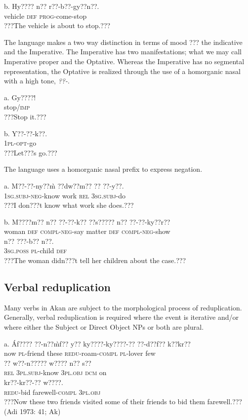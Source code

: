 \documentclass[output=paper]{langsci/langscibook}
\begin{document}
\ea
\gll  b.  Hy????    n??  r??-b??-gy??n??.\\
       vehicle    \textsc{def}  \textsc{prog}{}-come-stop\\
\glt   ???The vehicle is about to stop.???
\z

The language makes a two way distinction in terms of mood ??? the indicative and the Imperative. The Imperative has two manifestations; what we may call Imperative proper and the Optative. Whereas the Imperative has no segmental representation, the Optative is realized through the use of a homorganic nasal with a high tone, \emph{??-}. 

\ea
\gll a.  Gy????!\\
       stop/\textsc{imp}\\
\glt   ???Stop it.???
\z


\ea
\gll  b.  Y??-??-k??.\\
       \textsc{1pl}{}-\textsc{opt}{}-go\\
\glt   ???Let???s go.???
\z

The language uses a homorganic nasal prefix to express negation.


\ea
\gll a.  M??-??-ny??\`{m}     ??dw??m??  ??   ??{}-y??.\\
       \textsc{1sg.subj}{}-\textsc{neg}{}-know  work    \textsc{rel}  \textsc{3sg.subj}{}-do\\
\glt   ???I don???t know what work she does.???
\z

\ea
\gll  b.  M????m??    n??  ??-??-k??       ??s?????  n??  ??-??-ky??r??\\
       woman    \textsc{def}  \textsc{compl}{}-\textsc{neg}{}-say  matter  \textsc{def  compl}{}-\textsc{neg}{}-show\\
\gll   n??    ???-b??    n??.\\
       \textsc{3sg.poss}  \textsc{pl}{}-child  \textsc{def}\\
\glt   ???The woman didn???t tell her children about the case.???  
\z

\subsection{Verbal reduplication}

Many verbs in Akan are subject to the morphological process of reduplication. Generally, verbal reduplication is required where the event is iterative and/or where either the Subject or Direct Object NPs or both are plural.

\ea
\gll a.  \'{A}f????  ??-n??\`{m}f??   y??   ky????-ky????-??     ??-d??f??     k??kr?? \\
       now  \textsc{pl}{}-friend  these  \textsc{redu}{}-roam-\textsc{compl}  \textsc{pl}{}-lover  few  \\
\gll   ??  w??-n?????     w????     n??   s?? \\
       \textsc{rel}  \textsc{3pl.subj}{}-know  \textsc{3pl.obj}  \textsc{dcm}  on\\
\gll   kr??-kr??-??       w????.\\
       \textsc{redu}{}-bid farewell-\textsc{compl}  \textsc{3pl.obj}\\
\glt   ???Now these two friends visited some of their friends to bid them farewell.??? (Adi 1973: 41; Ak)
\z
\end{document}
